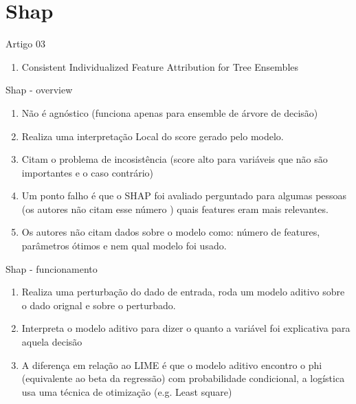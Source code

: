 \section{Shap}

\begin{frame}
	\begin{block}{Artigo 03}
	\begin{enumerate}
		\item Consistent Individualized Feature Attribution for Tree Ensembles
	\end{enumerate}
	\end{block}
\end{frame}


\begin{frame}
	\begin{block}{Shap - overview}
		\begin{enumerate}
			\item Não é agnóstico (funciona apenas para ensemble de árvore de decisão)
			\item Realiza uma interpretação Local do score gerado pelo modelo.
			\item Citam o problema de incosistência (score alto para variáveis que não são importantes e o caso contrário) 
			\item Um ponto falho é que o SHAP foi avaliado perguntado para algumas pessoas (os autores não citam esse número ) quais features eram mais relevantes.
			\item Os autores não citam dados sobre o modelo como: número de features, parâmetros ótimos e nem qual modelo foi usado.
		\end{enumerate}
	\end{block}
\end{frame}

\begin{frame}
	\begin{block}{Shap - funcionamento}
			\begin{enumerate}
				\item Realiza uma perturbação do dado de entrada, roda um modelo aditivo sobre o dado orignal e sobre o perturbado.
				\item Interpreta o modelo aditivo para dizer o quanto a variável foi explicativa para aquela decisão
				\item A diferença em relação ao LIME é que o modelo aditivo encontro o phi (equivalente ao beta da regressão) com probabilidade condicional, a logística usa uma técnica de otimização  (e.g. Least square)
			\end{enumerate}
	\end{block}
\end{frame}

